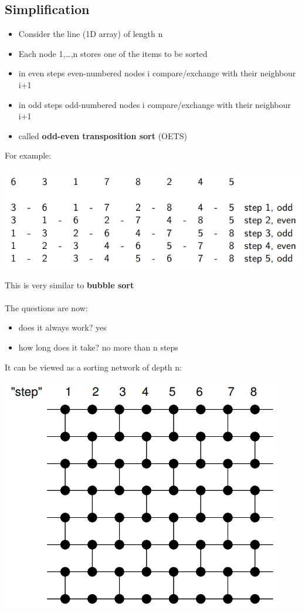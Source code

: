 \documentclass{article}[18pt]
\begin{document}
\subsection{Simplification}
\begin{itemize}
	\item Consider the line (1D array) of length n
	\item Each node 1,\ldots,n stores one of the items to be sorted
	\item in even steps even-numbered nodes i compare/exchange with their neighbour i+1
	\item in odd steps odd-numbered nodes i compare/exchange with their neighbour i+1
	\item called \textbf{odd-even transposition sort} (OETS)
\end{itemize}
For example:
\begin{center}
	\includegraphics[scale=0.7]{network}
\end{center}
This is very similar to \textbf{bubble sort}\\
\\
The questions are now:
\begin{itemize}
	\item does it always work? yes
	\item how long does it take? no more than n steps
\end{itemize}
It can be viewed as a sorting network of depth n:
\begin{center}
	\includegraphics[scale=0.7]{network1}
\end{center}
\end{document}
